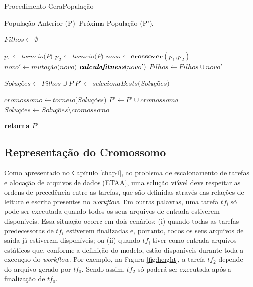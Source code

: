 \begin{algorithm}[H]
\caption{Procedimento  GeraPopulação}\label{algo:doPop}

\begin{algorithmic}[1]
\Require População Anterior (P).
\Ensure Próxima População (P').

    \State $Filhos \gets \emptyset$

         \State $p_1 \gets \textit{torneio(P)}$
         \State $p_2 \gets \textit{torneio(P)}$
         \State $novo \gets \textbf{crossover}(p_1, p_2)$ 
         \State $novo' \gets \textit{mutação(novo)}$ \label{l:mut}
         \State $\textit{\textbf{calculafitness}}(novo')$ 
         \State $Filhos \gets Filhos \cup novo'$         
    \EndFor

    \State $\textit{Soluções} \gets Filhos \cup \textit{P}$  \label{l:selecaoInit}
    \State $P' \gets \textit{selecionaBests(Soluções)}$  \label{l:elitism}
    
        \State $cromossomo \gets \textit{torneio(Soluções)}$
        \State $P' \gets P' \cup cromossomo$
        \State $\textit{Soluções} \gets \textit{Soluções} \setminus cromossomo$ \label{l:selecaoFim}
    \EndWhile 

    \State \textbf{retorna} $P'$

\end{algorithmic}
\end{algorithm}


\subsection{Representação do Cromossomo} \label{sssec:encode}
 
Como apresentado no Capítulo \ref{chap4}, no problema de escalonamento de tarefas e alocação de arquivos de dados (ETAA), uma solução viável deve respeitar as ordens de precedência entre as tarefas, que são definidas através das relações de leitura e escrita presentes no \textit{workflow}. Em outras palavras, uma tarefa $tf_i$ só pode ser executada quando todos os seus arquivos de entrada estiverem disponíveis. Essa situação ocorre em dois cenários: (i) quando todas as tarefas predecessoras de $tf_i$ estiverem finalizadas e, portanto, todos os seus arquivos de saída já estiverem disponíveis; ou (ii) quando $tf_i$ tiver como entrada arquivos estáticos que, conforme a definição do modelo, estão disponíveis durante toda a execução do \textit{workflow}. Por exemplo, na Figura \ref{fig:height}, a tarefa $tf_2$ depende do arquivo gerado por $tf_0$. Sendo assim, $tf_2$ só poderá ser executada após a finalização de $tf_0$.

